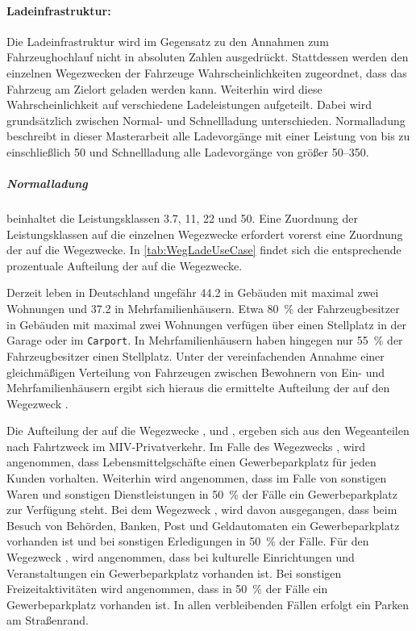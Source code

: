 

\paragraph{Ladeinfrastruktur:}

Die Ladeinfrastruktur wird im Gegensatz zu den Annahmen zum Fahrzeughochlauf nicht in absoluten Zahlen ausgedrückt.
Stattdessen werden den einzelnen Wegezwecken der Fahrzeuge Wahrscheinlichkeiten zugeordnet, dass das Fahrzeug am Zielort geladen werden kann.
Weiterhin wird diese Wahrscheinlichkeit auf verschiedene Ladeleistungen aufgeteilt.
Dabei wird grundsätzlich zwischen Normal- und Schnellladung unterschieden.
Normalladung beschreibt in dieser Masterarbeit alle Ladevorgänge mit einer Leistung von bis zu einschließlich \SI{50}{\kw} und Schnellladung alle Ladevorgänge von größer \SIrange[range-phrase=~bis~einschließlich~]{50}{350}{\kw}.

\subparagraph{Normalladung} beinhaltet die Leistungsklassen \SI{3.7}{\kw}, \SI{11}{\kw}, \SI{22}{\kw} und \SI{50}{\kw}.
Eine Zuordnung der Leistungsklassen auf die einzelnen Wegezwecke erfordert vorerst eine Zuordnung der \UCs auf die Wegezwecke.
In \autoref{tab:WegLadeUseCase} findet sich die entsprechende prozentuale Aufteilung der \UCs auf die Wegezwecke.



Derzeit leben in Deutschland ungefähr \SI{44.2}{\MioMen} in Gebäuden mit maximal zwei Wohnungen und \SI{37.2}{\MioMen} in Mehrfamilienhäusern.
Etwa \SI{80}{\percent} der Fahrzeugbesitzer in Gebäuden mit maximal zwei Wohnungen verfügen über einen Stellplatz in der Garage oder im \texttt{Carport}.
In Mehrfamilienhäusern haben hingegen nur \SI{55}{\percent} der Fahrzeugbesitzer einen Stellplatz. \cite{dena2020}
Unter der vereinfachenden Annahme einer gleichmäßigen Verteilung von Fahrzeugen zwischen Bewohnern von Ein- und Mehrfamilienhäusern ergibt sich hieraus die ermittelte Aufteilung der \UCs auf den Wegezweck \nHdot.\medskip

Die Aufteilung der \UCs auf die Wegezwecke \Einkaufdot, \Erledigung und \Freizeitdot, ergeben sich aus den Wegeanteilen nach Fahrtzweck im \gls{MIV}-Privatverkehr. \cite{Rikus2015}
Im Falle des Wegezwecks \Einkaufdot, wird angenommen, dass Lebensmittelgschäfte einen Gewerbeparkplatz für jeden Kunden vorhalten. Weiterhin wird angenommen, dass im Falle von sonstigen Waren und sonstigen Dienstleistungen in \SI{50}{\percent} der Fälle ein Gewerbeparkplatz zur Verfügung steht.
Bei dem Wegezweck \Erledigungdot, wird davon ausgegangen, dass beim Besuch von Behörden, Banken, Post und Geldautomaten ein Gewerbeparkplatz vorhanden ist und bei sonstigen Erledigungen in \SI{50}{\percent} der Fälle.
Für den Wegezweck \Freizeitdot, wird angenommen, dass bei kulturelle Einrichtungen und Veranstaltungen ein Gewerbeparkplatz vorhanden ist.
Bei sonstigen Freizeitaktivitäten wird angenommen, dass in \SI{50}{\percent} der Fälle ein Gewerbeparkplatz vorhanden ist.
In allen verbleibenden Fällen erfolgt ein Parken am Straßenrand.\medskip

